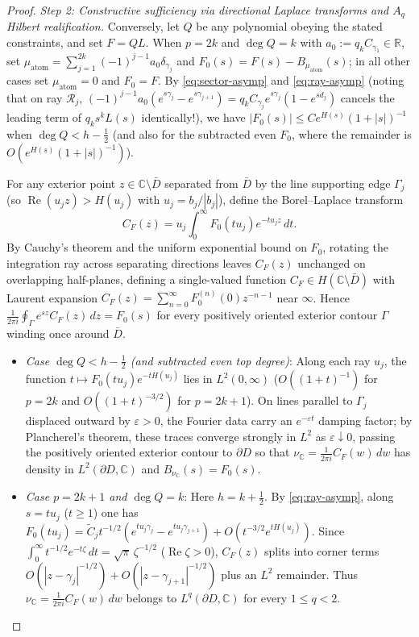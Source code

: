 \documentclass[11pt,reqno]{amsart}
\theoremstyle{definition}
\theoremstyle{remark}
\newcommand{\C}{\mathbb{C}}
\newcommand{\R}{\mathbb{R}}
\begin{document}
\begin{proof}
\emph{Step 2: Constructive sufficiency via directional Laplace transforms and $A_q$ Hilbert realification.}
Conversely, let $Q$ be any polynomial obeying the stated constraints, and set $F = Q L$. When $p = 2k$ and $\deg Q = k$ with $a_0 := q_k C_{\gamma_1} \in \R$, set $\mu_{\mathrm{atom}} = \sum_{j=1}^{2k} (-1)^{j-1} a_0 \delta_{\gamma_j}$ and $F_0(s) = F(s) - B_{\mu_{\mathrm{atom}}}(s)$; in all other cases set $\mu_{\mathrm{atom}} = 0$ and $F_0 = F$. By \eqref{eq:sector-asymp} and \eqref{eq:ray-asymp} (noting that on ray $\mathcal{R}_j$, $(-1)^{j-1} a_0(e^{s\gamma_j} - e^{s\gamma_{j+1}}) = q_k C_{\gamma_j} e^{s\gamma_j}(1 - e^{s d_j})$ cancels the leading term of $q_k s^k L(s)$ identically!), we have $|F_0(s)| \le C e^{H(s)}(1 + |s|)^{-1}$ when $\deg Q < h - \frac12$ (and also for the subtracted even $F_0$, where the remainder is $O(e^{H(s)}(1+|s|)^{-1})$).

For any exterior point $z \in \C \setminus \bar D$ separated from $\bar D$ by the line supporting edge $\Gamma_j$ (so $\operatorname{Re}(u_j z) > H(u_j)$ with $u_j = b_j/|b_j|$), define the Borel--Laplace transform
\begin{equation}\label{eq:CF}
  C_F(z) = u_j \int_0^\infty F_0(t u_j) e^{-t u_j z}\,dt.
\end{equation}
By Cauchy's theorem and the uniform exponential bound on $F_0$, rotating the integration ray across separating directions leaves $C_F(z)$ unchanged on overlapping half-planes, defining a single-valued function $C_F \in H(\C \setminus \bar D)$ with Laurent expansion $C_F(z) = \sum_{n=0}^\infty F_0^{(n)}(0) z^{-n-1}$ near $\infty$. Hence $\frac{1}{2\pi i}\oint_\Gamma e^{sz} C_F(z)\,dz = F_0(s)$ for every positively oriented exterior contour $\Gamma$ winding once around $\bar D$.

\begin{itemize}
  \item \emph{Case $\deg Q < h - \frac12$ (and subtracted even top degree)}: Along each ray $u_j$, the function $t \mapsto F_0(t u_j) e^{-t H(u_j)}$ lies in $L^2(0,\infty)$ ($O((1+t)^{-1})$ for $p=2k$ and $O((1+t)^{-3/2})$ for $p=2k+1$). On lines parallel to $\Gamma_j$ displaced outward by $\varepsilon > 0$, the Fourier data carry an $e^{-\varepsilon t}$ damping factor; by Plancherel's theorem, these traces converge strongly in $L^2$ as $\varepsilon \downarrow 0$, passing the positively oriented exterior contour to $\partial D$ so that $\nu_\C = \frac{1}{2\pi i} C_F(w)\,dw$ has density in $L^2(\partial D, \C)$ and $B_{\nu_\C}(s) = F_0(s)$.
  \item \emph{Case $p = 2k+1$ and $\deg Q = k$}: Here $h = k + \frac12$. By \eqref{eq:ray-asymp}, along $s = t u_j$ ($t \ge 1$) one has $F_0(t u_j) = \widetilde C_j t^{-1/2}(e^{t u_j \gamma_j} - e^{t u_j \gamma_{j+1}}) + O(t^{-3/2} e^{t H(u_j)})$. Since $\int_0^\infty t^{-1/2} e^{-t \zeta}\,dt = \sqrt{\pi}\,\zeta^{-1/2}$ ($\operatorname{Re}\zeta > 0$), $C_F(z)$ splits into corner terms $O(|z - \gamma_j|^{-1/2}) + O(|z - \gamma_{j+1}|^{-1/2})$ plus an $L^2$ remainder. Thus $\nu_\C = \frac{1}{2\pi i} C_F(w)\,dw$ belongs to $L^q(\partial D, \C)$ for every $1 \le q < 2$.
\end{itemize}


\end{proof}
\end{document}
